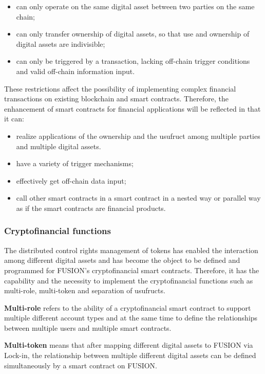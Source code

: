 \documentclass[a4paper,12pt]{article}
\begin{document}
\begin{itemize} [itemindent = 1em]
\item can only operate on the same digital asset between two parties on the same chain;
\item can only transfer ownership of digital assets, so that use and ownership of digital assets are indivisible;
\item can only be triggered by a transaction, lacking off-chain trigger conditions and valid off-chain information input.
\end{itemize}

These restrictions affect the possibility of implementing complex financial transactions on existing blockchain and smart contracts. Therefore, the enhancement of smart contracts for financial applications will be reflected in that it can:

\begin{itemize} [itemindent = 1em]
\item realize applications of the ownership and the usufruct among multiple parties and multiple digital assets.
\item have a variety of trigger mechanisms;
\item effectively get off-chain data input;
\item call other smart contracts in a smart contract in a nested way or parallel way as if the smart contracts are financial products.
\end{itemize}

\subsubsection{Cryptofinancial functions}

The distributed control rights management of tokens has enabled the interaction among different digital assets and has become the object to be defined and programmed for FUSION's cryptofinancial smart contracts. Therefore, it has the capability and the necessity to implement the cryptofinancial functions such as multi-role, multi-token and separation of usufructs.

{\bfseries Multi-role} refers to the ability of a cryptofinancial smart contract to support multiple different account types and at the same time to define the relationships between multiple users and multiple smart contracts.

{\bfseries Multi-token} means that after mapping different digital assets to FUSION via Lock-in, the relationship between multiple different digital assets can be defined simultaneously by a smart contract on FUSION.
\end{document}
